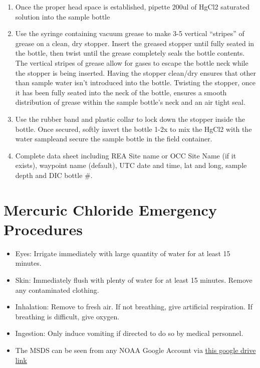 \documentclass[]{book}
\providecommand{\tightlist}{%
  \setlength{\itemsep}{0pt}\setlength{\parskip}{0pt}}
\begin{document}
\begin{enumerate}
\def\labelenumi{\alph{enumi}.}
\tightlist
\item
  Once the proper head space is established, pipette 200ul of HgCl2
  saturated solution into the sample bottle
\item
  Use the syringe containing vacuum grease to make 3-5 vertical
  ``stripes'' of grease on a clean, dry stopper. Insert the greased
  stopper until fully seated in the bottle, then twist until the grease
  completely seals the bottle contents. The vertical stripes of grease
  allow for gases to escape the bottle neck while the stopper is being
  inserted. Having the stopper clean/dry ensures that other than sample
  water isn't introduced into the bottle. Twisting the stopper, once it
  has been fully seated into the neck of the bottle, ensures a smooth
  distribution of grease within the sample bottle's neck and an air
  tight seal.
\item
  Use the rubber band and plastic collar to lock down the stopper inside
  the bottle. Once secured, softly invert the bottle 1-2x to mix the
  HgCl2 with the water sampleand secure the sample bottle in the field
  container.
\item
  Complete data sheet including REA Site name or OCC Site Name (if it
  exists), waypoint name (default), UTC date and time, lat and long,
  sample depth and DIC bottle \#.
\end{enumerate}

\section{Mercuric Chloride Emergency
Procedures}\label{mercuric-chloride-emergency-procedures}

\begin{itemize}
\tightlist
\item
  Eyes: Irrigate immediately with large quantity of water for at least
  15 minutes.
\item
  Skin: Immediately flush with plenty of water for at least 15 minutes.
  Remove any contaminated clothing.
\item
  Inhalation: Remove to fresh air. If not breathing, give artificial
  respiration. If breathing is difficult, give oxygen.
\item
  Ingestion: Only induce vomiting if directed to do so by medical
  personnel.
\item
  The MSDS can be seen from any NOAA Google Account via
  \href{https://drive.google.com/open?id=12w0Kmi8VVE9n_0A5_BhNVq6l4nMDtM1K}{this
  google drive link}
\end{itemize}
\end{document}
